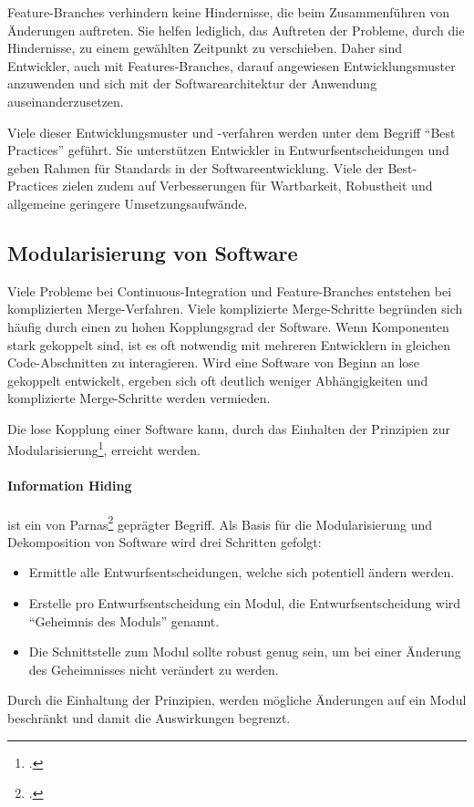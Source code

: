Feature-Branches verhindern keine Hindernisse, die beim Zusammenführen von Änderungen auftreten. Sie helfen lediglich, das Auftreten der Probleme, durch die Hindernisse, zu einem gewählten Zeitpunkt zu verschieben. Daher sind Entwickler, auch mit Features-Branches, darauf angewiesen Entwicklungsmuster anzuwenden und sich mit der Softwarearchitektur der Anwendung auseinanderzusetzen.

Viele dieser Entwicklungsmuster und -verfahren werden unter dem Begriff ``Best Practices'' geführt. Sie unterstützen Entwickler in Entwurfsentscheidungen und geben Rahmen für Standards in der Softwareentwicklung. Viele der Best-Practices zielen zudem auf Verbesserungen für Wartbarkeit, Robustheit und allgemeine geringere Umsetzungsaufwände.

\subsection{Modularisierung von Software}

Viele Probleme bei Continuous-Integration und Feature-Branches entstehen bei komplizierten Merge-Verfahren. Viele komplizierte Merge-Schritte begründen sich häufig durch einen zu hohen Kopplungsgrad der Software. Wenn Komponenten stark gekoppelt sind, ist es oft notwendig mit mehreren Entwicklern in gleichen Code-Abschnitten zu interagieren. Wird eine Software von Beginn an lose gekoppelt entwickelt, ergeben sich oft deutlich weniger Abhängigkeiten und komplizierte Merge-Schritte werden vermieden.

Die lose Kopplung einer Software kann, durch das Einhalten der Prinzipien zur Modularisierung\footcite{2012-barth-modularisation}, erreicht werden. 

\paragraph{Information Hiding} ist ein von Parnas\footcite{1972-parnas} geprägter Begriff. Als Basis für die Modularisierung und Dekomposition von Software wird drei Schritten gefolgt:
\begin{itemize}
\item Ermittle alle Entwurfsentscheidungen, welche sich potentiell ändern werden.
\item Erstelle pro Entwurfsentscheidung ein Modul, die Entwurfsentscheidung wird ``Geheimnis des Moduls'' genannt.
\item Die Schnittstelle zum Modul sollte robust genug sein, um bei einer Änderung des Geheimnisses nicht verändert zu werden.
\end{itemize}
Durch die Einhaltung der Prinzipien, werden mögliche Änderungen auf ein Modul beschränkt und damit die Auswirkungen begrenzt.
